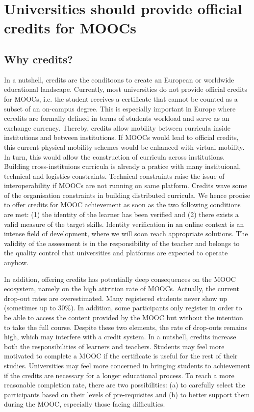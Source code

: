 \section{Universities should provide official credits for MOOCs}
\label{sec:credit}
 
\subsection{Why credits?}

In a nutshell, credits are the conditoons to create an European or
worldwide educational landscape. 
Currently, most universities do not provide official credits for MOOCs,
i.e. the student receives a certificate that cannot be counted as a
subset of an on-campus degree. This is especially important in Europe where
ceredits are formally defined in terms of students workload and serve as
an exchange currency. Thereby, credits allow mobility between curricula inside
institutions and between institutions. If MOOCs would lead to official
credits, this current physical mobility schemes would be enhanced with 
virtual mobility. In turn, this would allow the construction of curricula
across institutions. Building cross-instituions curricula is already a
pratice with many instituional, technical and logistics constraints. 
Technical constraints raise the issue of interoperability if MOOCs are not
running on same platform. Credits wave some of the organisation constraints
in building distributed curricula. We hence prooise to offer  credits for 
MOOC achievement as soon as the two following conditions are met: (1) the identity of the
learner has been verified and (2) there exists a valid
measure of the target skills. Identity verification in an online context
is an intense field of development, where we will soon reach appropriate
solutions. The validity of the assessment is in the responsibility of
the teacher and belongs to the quality control that universities and
platforms are expected to operate anyhow.

In addition, offering credits has potentially deep consequences on the MOOC
ecosystem, namely on the high attrition rate of MOOCs. Actually, the
current drop-out rates are overestimated. Many registered students never
show up (sometimes up to 30\%). In addition, some participants only
register in order to be able to access the content provided by the MOOC
but without the intention to take the full course. Despite these two
elements, the rate of drop-outs remains high, which may interfere with a
credit system. In a nutshell, credits increase both the responsibilities
of learners and teachers. Students may feel more motivated to complete a
MOOC if the certificate is useful for the rest of their
studies. Universities may feel more concerned in bringing students to
achievement if the credits are necessary for a longer educational
process.  To reach a more reasonable completion rate, there are two
possibilities: (a) to carefully select the participants based on their
levels of pre-requisites and (b) to better support them during the MOOC,
especially those facing difficulties. 


